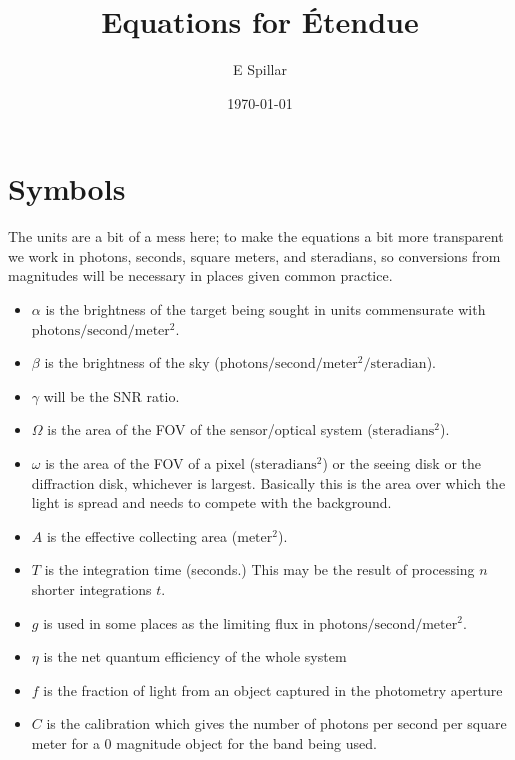 \documentclass[10pt]{article}
\title{Equations for \'Etendue}
\author{E Spillar}
\date{\today}
\begin{document}
\maketitle
\tableofcontents
\section{Symbols}
The units are a bit of a mess here; to make the equations a bit more 
transparent we work in photons, seconds, square meters, and 
steradians, so conversions from magnitudes will be necessary in 
places given common practice.
\newpage
\begin{itemize}
    \item $\alpha$ is the brightness of the target
    being sought in units commensurate with
    $\mathrm{photons/second/meter^2}.$
    \item $\beta$ is the brightness of the sky
    ($\mathrm{photons/second/meter^2/steradian}$).
    \item $\gamma$ will be the SNR ratio.
    \item $\Omega$ is the area of the  FOV of the sensor/optical system ($\mathrm{steradians^2}$).
    \item $\omega$ is the area of the  FOV of a pixel ($\mathrm{steradians^2}$) or the seeing disk or the diffraction disk,
    whichever is largest. Basically this is the area over which
    the light is spread and needs to compete with the
    background. 
    \item $A$ is the effective collecting area 
    ($\mathrm{meter^2}$).
    \item $T$ is the integration time (seconds.) This may be the result
    	of processing $n$ shorter integrations $t.$ 
     \item $g$ is used in some places as the limiting flux 
   	in 	$\mathrm{photons/second/meter^2}.$
   	\item $\eta$ is the net quantum efficiency of the whole system
	\item $f$ is the fraction of light from an object captured
			in the photometry aperture
	\item $C$ is the calibration which gives the number of photons per second per square meter for a 0 magnitude object for the band being used.
\end{itemize}
\end{document}
